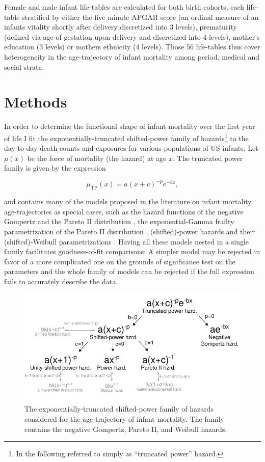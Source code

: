 \documentclass[smallextended]{svjour3} %
\makeatletter
\def\maxwidth{\ifdim\Gin@nat@width>\linewidth\linewidth
\else\Gin@nat@width\fi}
\let\Oldincludegraphics\includegraphics
\renewcommand{\includegraphics}[1]{\Oldincludegraphics[width=\maxwidth]{#1}}
\makeatother
\begin{document}
Female and male infant life-tables are calculated for both birth
cohorts, each life-table stratified by either the five minute APGAR
score (an ordinal measure of an infants vitality shortly after delivery
discretized into 3 levels), prematurity (defined via age of gestation
upon delivery and discretized into 4 levels), mother's education (3
levels) or mothers ethnicity (4 levels). Those 56 life-tables thus cover
heterogeneity in the age-trajectory of infant mortality among period,
medical and social strata.

\section*{Methods}\label{methods}

In order to determine the functional shape of infant mortality over the
first year of life I fit the exponentially-truncated shifted-power
family of hazards\footnote{In the following referred to simply as
  ``truncated power'' hazard.} to the day-to-day death counts and
exposures for various populations of US infants. Let \(\mu(x)\) be the
force of mortality (the hazard) at age \(x\). The truncated power family
is given by the expression

\[
\mu_\text{TP}(x) = a(x+c)^{-p}e^{-bx},
\]

and contains many of the models proposed in the literature on infant
mortality age-trajectories as special cases, such as the hazard
functions of the negative Gompertz
\citep[pp.~368]{Lomax1954, Marshall2007} and the Pareto II distribution
\citep[pp.~400]{Lomax1954, Marshall2007}, the exponential-Gamma frailty
parametrization of the Pareto II distribution
\citep[p.~78]{Clayton1985, Wienke2011}, (shifted)-power hazards and
their (shifted)-Weibull parametrizations \citep[pp.~321, see figure
\ref{fig:plot-models}]{Lehman1963, Marshall2007}. Having all these
models nested in a single family facilitates goodness-of-fit
comparisons: A simpler model may be rejected in favor of a more
complicated one on the grounds of significance test on the parameters
and the whole family of models can be rejected if the full expression
fails to accurately describe the data.

\begin{figure}
\centering
\includegraphics{fig/models.pdf}
\caption{\label{fig:plot-models}The exponentially-truncated shifted-power
family of hazards considered for the age-trajectory of infant mortality.
The family contains the negative Gompertz, Pareto II, and Weibull
hazards.}
\end{figure}
\end{document}
